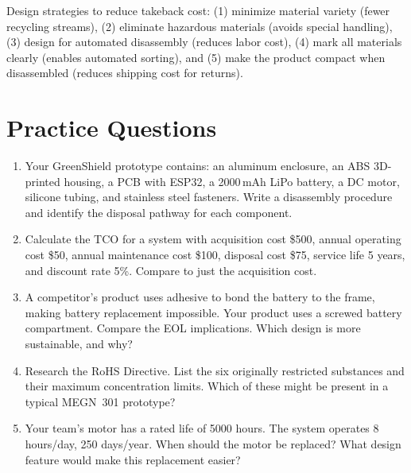 \documentclass[11pt,letterpaper,twoside,openany]{book}
\begin{document}
Design strategies to reduce takeback cost: (1) minimize material variety (fewer recycling streams), (2) eliminate hazardous materials (avoids special handling), (3) design for automated disassembly (reduces labor cost), (4) mark all materials clearly (enables automated sorting), and (5) make the product compact when disassembled (reduces shipping cost for returns).
\section{Practice Questions}
\begin{enumerate}[leftmargin=1.5em]
\item Your GreenShield prototype contains: an aluminum enclosure, an ABS 3D-printed housing, a PCB with ESP32, a 2000\,mAh LiPo battery, a DC motor, silicone tubing, and stainless steel fasteners. Write a disassembly procedure and identify the disposal pathway for each component.
\item Calculate the TCO for a system with acquisition cost \$500, annual operating cost \$50, annual maintenance cost \$100, disposal cost \$75, service life 5 years, and discount rate 5\%. Compare to just the acquisition cost.
\item A competitor's product uses adhesive to bond the battery to the frame, making battery replacement impossible. Your product uses a screwed battery compartment. Compare the EOL implications. Which design is more sustainable, and why?
\item Research the RoHS Directive. List the six originally restricted substances and their maximum concentration limits. Which of these might be present in a typical MEGN~301 prototype?
\item Your team's motor has a rated life of 5000 hours. The system operates 8 hours/day, 250 days/year. When should the motor be replaced? What design feature would make this replacement easier?
\end{enumerate}
\end{document}

